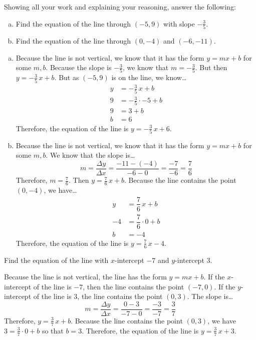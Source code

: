 \documentclass[11pt,letterpaper]{article}
\begin{document}

 Showing all your work and explaining your reasoning, answer the following:
	\begin{enumerate}[(a)]
	\item Find the equation of the line through $(-5, 9)$ with slope $-\frac{3}{5}$.
	\item Find the equation of the line through $(0, -4)$ and $(-6, -11)$. 
	\end{enumerate} \pspace

\sol 
\begin{enumerate}[(a)]
\item Because the line is not vertical, we know that it has the form $y= mx + b$ for some $m, b$. Because the slope is $-\frac{3}{5}$, we know that $m= -\frac{3}{5}$. But then $y= -\frac{3}{5}\,x + b$. But as $(-5, 9)$ is on the line, we know\dots
	\[
	\begin{aligned}
	y&= -\frac{3}{5}\,x + b \\[0.3cm]
	9&= -\frac{3}{5} \cdot -5 + b \\[0.3cm]
	9&= 3 + b \\[0.3cm]
	b&= 6
	\end{aligned}
	\]
Therefore, the equation of the line is $y= -\frac{3}{5}\,x + 6$. \pspace

\item Because the line is not vertical, we know that it has the form $y= mx + b$ for some $m, b$. We know that the slope is\dots
	\[
	m= \dfrac{\Delta y}{\Delta x}= \dfrac{-11 - (-4)}{-6 - 0}= \dfrac{-7}{-6}= \dfrac{7}{6}
	\]
Therefore, $m= \frac{7}{6}$. Then $y= \frac{7}{6}\,x + b$. Because the line contains the point $(0, -4)$, we have\dots
	\[
	\begin{aligned}
	y&= \dfrac{7}{6}\,x + b \\[0.3cm]
	-4&= \dfrac{7}{6} \cdot 0 + b \\[0.3cm]
	b&= -4
	\end{aligned}
	\]
Therefore, the equation of the line is $y= \frac{7}{6}\,x - 4$. 
\end{enumerate}



\newpage



 Find the equation of the line with $x$-intercept $-7$ and $y$-intercept 3. \pspace

\sol Because the line is not vertical, the line has the form $y= mx + b$. If the $x$-intercept of the line is $-7$, then the line contains the point $(-7, 0)$. If the $y$-intercept of the line is 3, the line contains the point $(0, 3)$. The slope is\dots
	\[
	m= \dfrac{\Delta y}{\Delta x}= \dfrac{0 - 3}{-7 - 0}= \dfrac{-3}{-7}= \dfrac{3}{7}
	\]
Therefore, $y= \frac{3}{7}\,x + b$. Because the line contains the point $(0, 3)$, we have $3= \frac{3}{7} \cdot 0 + b$ so that $b= 3$. Therefore, the equation of the line is $y= \frac{3}{7}\,x + 3$. 
\end{document}
